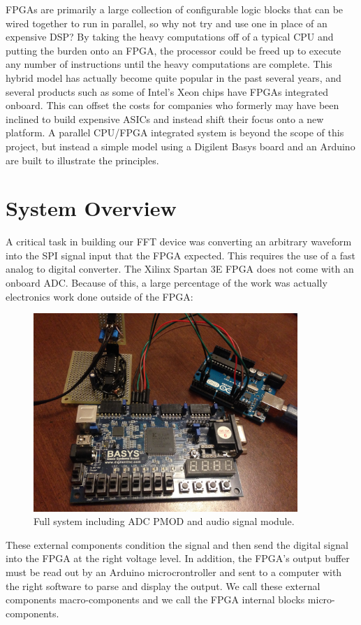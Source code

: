 \documentclass[12pt]{article}
\begin{document}
    FPGAs are primarily a large collection of configurable logic blocks that can be wired together to run in parallel, so why not try and use one in place of an expensive DSP?
    By taking the heavy computations off of a typical CPU and putting the burden onto an FPGA, the processor could be freed up to execute any number of instructions until the heavy computations are complete.
    This hybrid model has actually become quite popular in the past several years, and several products such as some of Intel's Xeon chips have FPGAs integrated onboard.
    This can offset the costs for companies who formerly may have been inclined to build expensive ASICs and instead shift their focus onto a new platform.
    A parallel CPU/FPGA integrated system is beyond the scope of this project, but instead a simple model using a Digilent Basys board and an Arduino are built to illustrate the principles.

  \section*{System Overview}
    A critical task in building our FFT device was converting an arbitrary waveform into the SPI signal input that the FPGA expected. This requires the use of a fast analog to digital converter. The Xilinx Spartan 3E FPGA does not come with an onboard ADC. Because of this, a large percentage of the work was actually electronics work done outside of the FPGA:

    \begin{figure}[H]
      \centering
      \includegraphics[width=100mm]{full_system.JPG}
      \caption{Full system including ADC PMOD and audio signal module.}
      \label{overflow}
    \end{figure}
    
    These external components condition the signal and then send the digital signal into the FPGA at the right voltage level. In addition, the FPGA's output buffer must be read out by an Arduino microcrontroller and sent to a computer with the right software to parse and display the output. We call these external components macro-components and we call the FPGA internal blocks micro-components.
  
\end{document}
